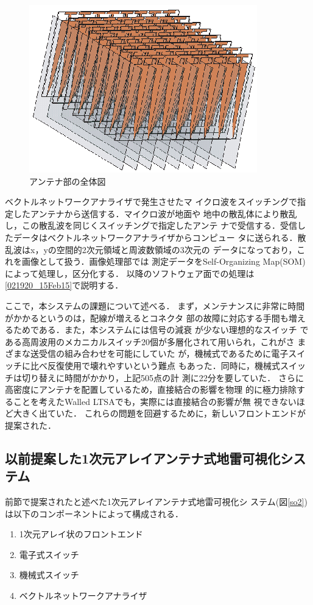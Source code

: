 ﻿\documentclass[12pt,oneside]{jsbook}
\begin{document}
\begin{figure}[hbtp]
\begin{center}
\includegraphics[width=0.6\hsize]{LTSA.eps}
\caption{アンテナ部の全体図} \label{pic:transmit} 
\end{center}
\end{figure}
ベクトルネットワークアナライザで発生させたマ
イクロ波をスイッチングで指定したアンテナから送信する．マイクロ波が地面や
地中の散乱体により散乱し，この散乱波を同じくスイッチングで指定したアンテ
ナで受信する．受信したデータはベクトルネットワークアナライザからコンピュー
タに送られる．散乱波はx，yの空間的2次元領域と周波数領域の3次元の
データになっており，これを画像として扱う．画像処理部では
測定データをSelf-Organizing Map(SOM)によって処理し，区分化する．
以降のソフトウェア面での処理は
\ref{021920_15Feb15}で説明する．

ここで，本システムの課題について述べる．
まず，メンテナンスに非常に時間がかかるというのは，配線が増えるとコネクタ
部の故障に対応する手間も増えるためである．また，本システムには信号の減衰
が少ない理想的なスイッチ
である高周波用のメカニカルスイッチ20個が多層化されて用いられ，これがさ
まざまな送受信の組み合わせを可能にしていた\cite{2008SMas}
が，機械式であるために電子スイッチに比べ反復使用で壊れやすいという難点
もあった．同時に，機械式スイッチは切り替えに時間がかかり，上記505点の計
測に22分を要していた．
さらに高密度にアンテナを配置しているため，直接結合の影響を物理
的に極力排除することを考えたWalled LTSAでも，実際には直接結合の影響が無
視できないほど大きく出ていた．
これらの問題を回避するために，新しいフロントエンドが提案された．


\subsection{以前提案した1次元アレイアンテナ式地雷可視化システム}\label{1array_before}
前節で提案されたと述べた1次元アレイアンテナ式地雷可視化シ
ステム\cite{ejiri}(図\ref{so2})は以下のコンポーネントによって構成される．
\begin{enumerate}
\item 1次元アレイ状のフロントエンド
\item 電子式スイッチ
\item 機械式スイッチ
\item ベクトルネットワークアナライザ
\end{enumerate}
\end{document}
